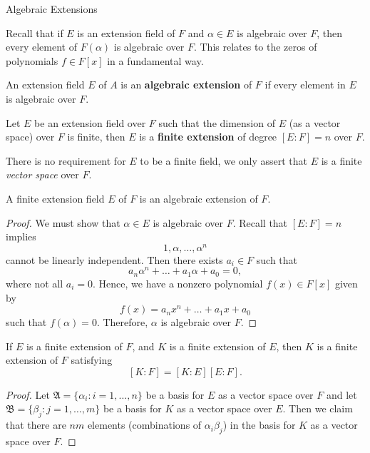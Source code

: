 
\begin{section}{Algebraic Extensions}

Recall that if $E$ is an extension field of $F$ and $\alpha \in E$ is algebraic over $F$, then every element of $F(\alpha)$ is algebraic over $F$. This relates to the zeros of polynomials $f \in F[x]$ in a fundamental way.

\begin{defn}
An extension field $E$ of $A$ is an {\bf algebraic extension} of $F$ if every element in $E$ is algebraic over $F$.
\end{defn}

\begin{defn}
Let $E$ be an extension field over $F$ such that the dimension of $E$ (as a vector space) over $F$ is finite, then $E$ is a {\bf finite extension} of degree $[E \colon F] = n$ over $F$.
\end{defn}

\begin{danger}
There is no requirement for $E$ to be a finite field, we only assert that $E$ is a finite {\em vector space} over $F$.
\end{danger}

\begin{prop}
A finite extension field $E$ of $F$ is an algebraic extension of $F$.
\end{prop}

\begin{proof}
  We must show that $\alpha \in E$ is algebraic over $F$. Recall that $[E \colon F] = n$ implies $$1, \alpha, \dots, \alpha^{n}$$ cannot be linearly independent. Then there exists $a_{i} \in F$ such that $$a_{n}\alpha^{n} + \dots + a_{1}\alpha + a_{0} = 0,$$ where not all $a_{i} = 0$. Hence, we have a nonzero polynomial $f(x) \in F[x]$ given by 
$$f(x) = a_{n}x^{n} + \dots + a_{1}x + a_{0}$$ such that $f(\alpha) = 0$. Therefore, $\alpha$ is algebraic over $F$.
\end{proof}

\begin{thm}
If $E$ is a finite extension of $F$, and $K$ is a finite extension of $E$, then $K$ is a finite extension of $F$ satisfying $$[K \colon F] = [K \colon E] [E \colon F].$$
\end{thm}

\begin{proof}
Let $\mathfrak{A} = \{\alpha_{i} \colon i = 1, \dots, n\}$ be a basis for $E$ as a vector space over $F$ and let $\mathfrak{B} = \{\beta_{j} \colon j = 1, \dots, m\}$ be a basis for $K$ as a vector space over $E$. Then we claim that there are $nm$ elements (combinations of $\alpha_{i}\beta_{j}$) in the basis for $K$ as a vector space over $F$.


\end{proof}
\end{section}
